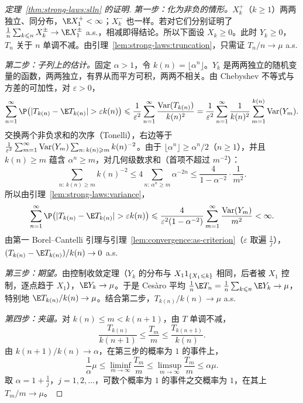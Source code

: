 \begin{proof}[定理~\ref{thm:strong-laws:slln} 的证明]
\emph{第一步：化为非负的情形。}$X_k^+$（$k\geqslant1$）两两独立、同分布，$\E X_1^+<\infty$；$X_k^-$ 也一样。若对它们分别证明了 $\frac1n\sum_{k\leqslant n}X_k^\pm\to \E X_1^\pm$ a.s.，相减即得结论。所以下面设 $X_k\geqslant0$。此时 $Y_k\geqslant0$，$T_n$ 关于 $n$ 单调不减。由引理~\ref{lem:strong-laws:truncation}，只需证 $T_n/n\to\mu$ a.s.

\emph{第二步：子列上的估计。}固定 $\alpha>1$，令 $k(n)=\lfloor\alpha^n\rfloor$。$Y_k$ 是两两独立的随机变量的函数，两两独立，有界从而平方可积，两两不相关。由 Chebyshev 不等式与方差的可加性，对 $\varepsilon>0$，
\[
\sum_{n=1}^\infty \P\bigl(\abs{T_{k(n)}-\E T_{k(n)}}>\varepsilon k(n)\bigr)\leqslant\frac1{\varepsilon^2}\sum_{n=1}^\infty\frac{\Var(T_{k(n)})}{k(n)^2}=\frac1{\varepsilon^2}\sum_{n=1}^\infty\frac1{k(n)^2}\sum_{m=1}^{k(n)}\Var(Y_m).
\]
交换两个非负求和的次序（Tonelli），右边等于 $\frac1{\varepsilon^2}\sum_{m=1}^\infty\operatorname{Var}(Y_m)\sum_{n:\,k(n)\geqslant m}k(n)^{-2}$。由于 $\lfloor\alpha^n\rfloor\geqslant\alpha^n/2$（$n\geqslant1$），并且 $k(n)\geqslant m$ 蕴含 $\alpha^n\geqslant m$，对几何级数求和（首项不超过 $m^{-2}$）：
\[
\sum_{n:\,k(n)\geqslant m}k(n)^{-2}\leqslant4\sum_{n:\,\alpha^n\geqslant m}\alpha^{-2n}\leqslant\frac4{1-\alpha^{-2}}\cdot\frac1{m^2}.
\]
所以由引理~\ref{lem:strong-laws:variance}，
\[
\sum_{n=1}^\infty \P\bigl(\abs{T_{k(n)}-\E T_{k(n)}}>\varepsilon k(n)\bigr)\leqslant\frac4{\varepsilon^2(1-\alpha^{-2})}\sum_{m=1}^\infty\frac{\Var(Y_m)}{m^2}<\infty .
\]
由第一 Borel--Cantelli 引理与引理~\ref{lem:convergence:as-criterion}（$\varepsilon$ 取遍 $\frac1j$），$(T_{k(n)}-\E T_{k(n)})/k(n)\to0$ a.s.

\emph{第三步：期望。}由控制收敛定理（$Y_k$ 的分布与 $X_11_{\{X_1\leqslant k\}}$ 相同，后者被 $X_1$ 控制，逐点趋于 $X_1$），$\E Y_k\to\mu$。于是 Cesàro 平均 $\frac1n\E T_n=\frac1n\sum_{k\leqslant n}\E Y_k\to\mu$，特别地 $\E T_{k(n)}/k(n)\to\mu$。结合第二步，$T_{k(n)}/k(n)\to\mu$ a.s.

\emph{第四步：夹逼。}对 $k(n)\leqslant m<k(n+1)$，由 $T$ 单调不减，
\[
\frac{T_{k(n)}}{k(n+1)}\leqslant\frac{T_m}m\leqslant\frac{T_{k(n+1)}}{k(n)} .
\]
由 $k(n+1)/k(n)\to\alpha$，在第三步的概率为 $1$ 的事件上，
\[
\frac1\alpha\mu\leqslant\liminf_{m\to\infty}\frac{T_m}m\leqslant\limsup_{m\to\infty}\frac{T_m}m\leqslant\alpha\mu .
\]
取 $\alpha=1+\frac1j$，$j=1,2,\dots$，可数个概率为 $1$ 的事件之交概率为 $1$，在其上 $T_m/m\to\mu$。
\end{proof}

